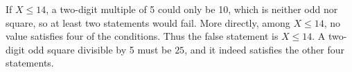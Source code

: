 If $X\le14$, a two-digit multiple of 5 could only be 10, which is neither odd nor square, so at least two statements would fail. More directly, among $X\le14$, no value satisfies four of the conditions. Thus the false statement is $X\le14$. A two-digit odd square divisible by 5 must be $\boxed{25}$, and it indeed satisfies the other four statements.
